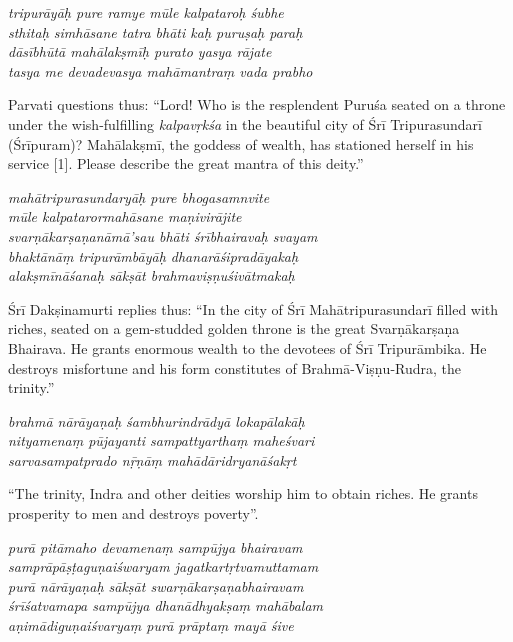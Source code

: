 \documentclass[11pt,oneside,a4paper]{article}
\newenvironment{shloka}[1]
  {\bigskip\center#1\varwidth{\linewidth}}
  {\endvarwidth\endcenter\bigskip}
\newcommand{\tl}[1]{\emph{#1}}
\begin{document}
\begin{shloka}\itshape
  tripurāyāḥ pure ramye mūle kalpataroḥ śubhe \\
  sthitaḥ simhāsane tatra bhāti kaḥ puruṣaḥ paraḥ \\
  dāsībhūtā mahālakṣmīḥ purato yasya rājate \\
  tasya me devadevasya mahāmantraṃ vada prabho
\end{shloka}

Parvati questions thus: ``Lord! Who is the resplendent Puruśa seated on
a throne under the wish-fulfilling \tl{kalpavṛkśa} in the beautiful city of
Śrī Tripurasundarī (Śrīpuram)? Mahālakṣmī, the goddess of wealth, has stationed
herself in his service [1]. Please describe the great mantra of this deity.''

\begin{shloka}\itshape
  mahātripurasundaryāḥ pure bhogasamnvite \\
  mūle kalpatarormahāsane maṇivirājite \\
  svarṇākarṣaṇanāmā'sau bhāti śrībhairavaḥ svayam \\
  bhaktānāṃ tripurāmbāyāḥ dhanarāśipradāyakaḥ \\
  alakṣmīnāśanaḥ sākṣāt brahmaviṣṇuśivātmakaḥ
\end{shloka}

Śrī Dakṣinamurti replies thus: ``In the city of Śrī Mahātripurasundarī filled
with riches, seated on a gem-studded golden throne is the great Svarṇākarṣaṇa
Bhairava. He grants enormous wealth to the devotees of Śrī Tripurāmbika.
He destroys misfortune and his form constitutes of Brahmā-Viṣṇu-Rudra,
the trinity.''

\begin{shloka}\itshape
  brahmā nārāyaṇaḥ śambhurindrādyā lokapālakāḥ \\
  nityamenaṃ pūjayanti sampattyarthaṃ maheśvari \\
  sarvasampatprado nṝṇāṃ mahādāridryanāśakṛt
\end{shloka}

``The trinity, Indra and other deities worship him to obtain riches. He grants
prosperity to men and destroys poverty''.

\begin{shloka}\itshape
  purā pitāmaho devamenaṃ sampūjya bhairavam \\
  samprāpāṣṭaguṇaiśwaryam jagatkartṛtvamuttamam \\
  purā nārāyaṇaḥ sākṣāt swarṇākarṣaṇabhairavam \\
  śrīśatvamapa sampūjya dhanādhyakṣaṃ mahābalam \\
  aṇimādiguṇaiśvaryaṃ purā prāptaṃ mayā śive
\end{shloka}
\end{document}
